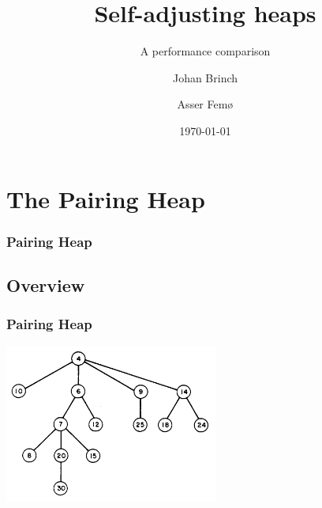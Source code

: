 \documentclass{beamer}
\title{Self-adjusting heaps}
\subtitle{A performance comparison}
\author{Johan Brinch \and Asser Femø}
\date{\today}
\begin{document}
\lstset{basicstyle=\footnotesize\ttfamily}
\begin{frame}
  \titlepage
\end{frame}

\section{The Pairing Heap}

\begin{frame}[fragile]
\frametitle{Pairing Heap}
\tableofcontents
\end{frame}

\subsection{Overview}
\begin{frame}[fragile]
\frametitle{Pairing Heap}

\begin{center}
\includegraphics[width=7cm]{../pairing-heap-slides/fig1.png}
\end{center}

\end{frame}
\end{document}
